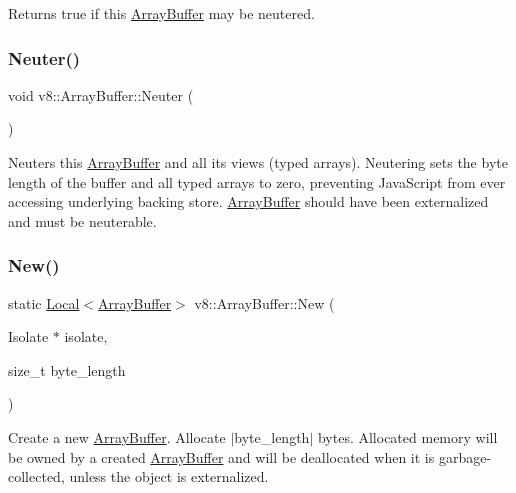 Returns true if this \mbox{\hyperlink{classv8_1_1ArrayBuffer}{Array\+Buffer}} may be neutered. \mbox{\label{classv8_1_1ArrayBuffer_a3420f7d38a8fe20e8f40fb82e6acb325}} 
\subsubsection{\texorpdfstring{Neuter()}{Neuter()}}
{\footnotesize\ttfamily void v8\+::\+Array\+Buffer\+::\+Neuter (\begin{DoxyParamCaption}{ }\end{DoxyParamCaption})}

Neuters this \mbox{\hyperlink{classv8_1_1ArrayBuffer}{Array\+Buffer}} and all its views (typed arrays). Neutering sets the byte length of the buffer and all typed arrays to zero, preventing Java\+Script from ever accessing underlying backing store. \mbox{\hyperlink{classv8_1_1ArrayBuffer}{Array\+Buffer}} should have been externalized and must be neuterable. \mbox{\label{classv8_1_1ArrayBuffer_ad752e03d7cc7fe863656ad6183785ab7}} 
\subsubsection{\texorpdfstring{New()}{New()}\hspace{0.1cm}{\footnotesize\ttfamily [1/2]}}
{\footnotesize\ttfamily static \mbox{\hyperlink{classv8_1_1Local}{Local}}$<$\mbox{\hyperlink{classv8_1_1ArrayBuffer}{Array\+Buffer}}$>$ v8\+::\+Array\+Buffer\+::\+New (\begin{DoxyParamCaption}\item[{Isolate $\ast$}]{isolate,  }\item[{size\+\_\+t}]{byte\+\_\+length }\end{DoxyParamCaption})\hspace{0.3cm}{\ttfamily [static]}}

Create a new \mbox{\hyperlink{classv8_1_1ArrayBuffer}{Array\+Buffer}}. Allocate $\vert$byte\+\_\+length$\vert$ bytes. Allocated memory will be owned by a created \mbox{\hyperlink{classv8_1_1ArrayBuffer}{Array\+Buffer}} and will be deallocated when it is garbage-\/collected, unless the object is externalized. \mbox{\label{classv8_1_1ArrayBuffer_acc65e714766b0d0d791b0d43ec52d0bb}} 
